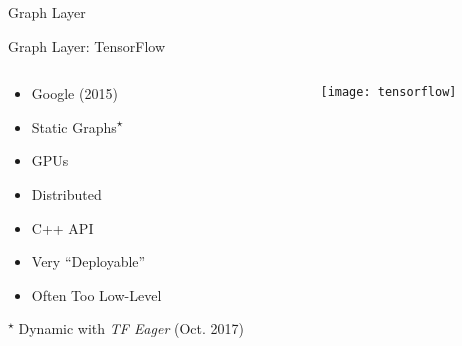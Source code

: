 
\begin{slide}{Graph Layer}
\end{slide}

\begin{slide}{Graph Layer: TensorFlow}
  \begin{columns}
    \begin{column}{0.5\textwidth}
      \vspace{0.7cm}
      \begin{itemize}
        \item Google (2015)
        \item Static Graphs\textsuperscript{$\star$}
        \item GPUs \cmark
        \item Distributed \cmark
        \item C++ API \xmark
        \item Very ``Deployable''
        \item Often Too Low-Level
      \end{itemize}

      \vspace{0.5cm}
      {\footnotesize \textsuperscript{$\star$} Dynamic with \textit{TF Eager} (Oct. 2017)}
    \end{column}
    \begin{column}{0.4\textwidth}
      \texttt{[image: tensorflow]}
    \end{column}
  \end{columns}
\end{slide}

